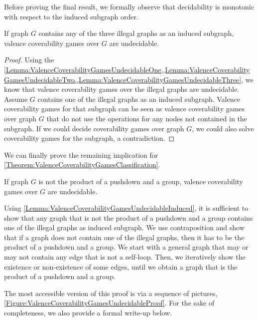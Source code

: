 \documentclass[../../diss.tex]{subfiles}
\begin{document}
Before proving the final result, we formally observe that decidability is monotonic with respect to the induced subgraph order.

\begin{lemma}%
\label{Lemma:ValenceCoverabilityGamesUndecidableInduced}%
    If graph $G$ contains any of the three illegal graphs as an induced subgraph, valence coverability games over $G$ are undecidable.
\end{lemma}

\begin{proof}
    Using the \cref{Lemma:ValenceCoverabilityGamesUndecidableOne,,Lemma:ValenceCoverabilityGamesUndecidableTwo,,Lemma:ValenceCoverabilityGamesUndecidableThree}, we know that valence coverability games over the illegal graphs are undecidable.
    Assume $G$ contains one of the illegal graphs as an induced subgraph.
    Valence coverability games for that subgraph can be seen as valence coverability games over graph $G$ that do not use the operations for any nodes not contained in the subgraph.
    If we could decide coverability games over graph $G$, we could also solve coverability games for the subgraph, a contradiction.
\end{proof}

We can finally prove the remaining implication for \cref{Theorem:ValenceCoverabilityGamesClassification}.

\begin{proposition}%
\label{Proposition:ValenceCoverabilityGamesUndecidable}
    If graph $G$ is not the product of a pushdown and a group, valence coverability games over $G$ are undecidable.
\end{proposition}

Using \cref{Lemma:ValenceCoverabilityGamesUndecidableInduced}, it is sufficient to show that any graph that is not the product of a pushdown and a group contains one of the illegal graphs as induced subgraph.
We use contraposition and show that if a graph does not contain one of the illegal graphs, then it has to be the product of a pushdown and a group.
We start with a general graph that may or may not contain any edge that is not a self-loop.
Then, we iteratively show the existence or non-existence of some edges, until we obtain a graph that is the product of a pushdown and a group.

The most accessible version of this proof is via a sequence of pictures, \cref{Figure:ValenceCoverabilityGamesUndecidableProof}.
For the sake of completeness, we also provide a formal write-up below.
\end{document}
